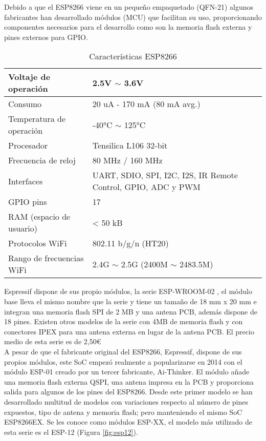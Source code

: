 \documentclass[../proyecto.tex]{subfiles}
\begin{document}
Debido a que el ESP8266 viene en un pequeño empaquetado (QFN-21) algunos fabricantes han desarrollado módulos (MCU) que facilitan su uso, proporcionando componentes necesarios para el desarrollo como son la memoria flash externa y pines externos para GPIO.\\

\begin{table}[H]
\centering
\begin{tabular}{ |l|m{20em}| }
\hline
Voltaje de operación      & 2.5V $\sim$ 3.6V          \\ \hline
Consumo                   & 20 uA - 170 mA (80 mA avg.)  \\ \hline
Temperatura de operación  & -40°C $\sim$ 125°C        \\ \hline
Procesador                & Tensilica L106 32-bit     \\ \hline
Frecuencia de reloj       & 80 MHz / 160 MHz          \\ \hline
Interfaces                & UART, SDIO, SPI, I2C, I2S, IR Remote Control, GPIO, ADC y PWM                           \\ \hline
GPIO pins                 & 17                        \\ \hline
RAM (espacio de usuario)  & < 50 kB                     \\ \hline
Protocolos WiFi           & 802.11 b/g/n (HT20)       \\ \hline
Rango de frecuencias WiFi & 2.4G $\sim$ 2.5G (2400M $\sim$ 2483.5M) \\ \hline
\end{tabular}
\caption{Características ESP8266}
\label{table:caracteristicas_esp8266}
\end{table}

Espressif dispone de sus propio módulos, la serie ESP-WROOM-02 \cite{espwroom02_overview}, el módulo base \cite{espwroom02_datasheet} lleva el mismo nombre que la serie y tiene un tamaño de 18 mm x 20 mm e integran una memoria flash SPI de 2 MB y una antena PCB, además dispone de 18 pines. Existen otros modelos de la serie con 4MB de memoria flash y con conectores IPEX para una antena externa en lugar de la antena PCB. El precio medio de esta serie es de 2,50€ \cite{espressif_provider_digikey} \cite{espressif_provider_mouser}\\

A pesar de que el fabricante original del ESP8266, Espressif, dispone de sus propios módulos, este SoC empezó realmente a popularizarse en 2014 con el módulo ESP-01 creado por un tercer fabricante, Ai-Thinker. El módulo añade una memoria flash externa QSPI, una antena impresa en la PCB y proporciona salida para algunos de los pines del ESP8266. Desde este primer modelo se han desarrollado multitud de modelos con variaciones respecto al número de pines expuestos, tipo de antena y memoria flash; pero manteniendo el mismo SoC ESP8266EX. Se les conoce como módulos ESP-XX, el modelo más utilizado de esta serie es el ESP-12 (Figura \ref{fig:esp12}). \\
\end{document}

